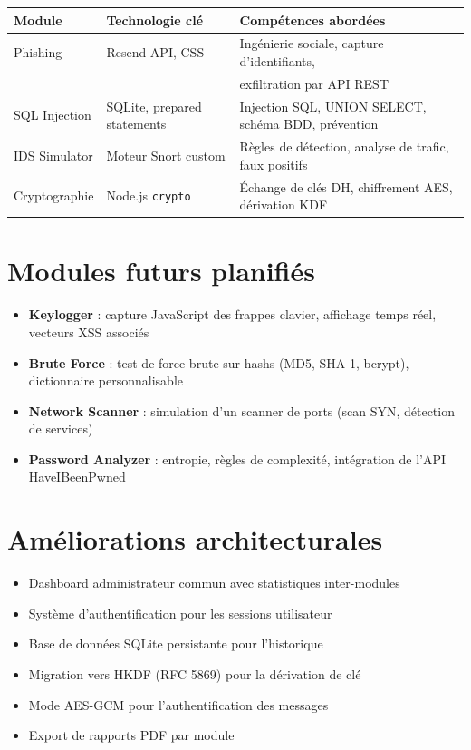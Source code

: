 \documentclass[12pt,a4paper]{report}
\newcommand{\code}[1]{\texttt{#1}}
\begin{document}
\begin{center}
\begin{tabular}{L{3cm} L{3.5cm} L{7cm}}
  \toprule
  \textbf{Module} & \textbf{Technologie clé} & \textbf{Compétences abordées} \\
  \midrule
  Phishing
    & Resend API, CSS
    & Ingénierie sociale, capture d'identifiants,\\
    & & exfiltration par API REST \\[5pt]
  SQL Injection
    & SQLite, prepared statements
    & Injection SQL, UNION SELECT, schéma BDD, prévention \\[5pt]
  IDS Simulator
    & Moteur Snort custom
    & Règles de détection, analyse de trafic, faux positifs \\[5pt]
  Cryptographie
    & Node.js \code{crypto}
    & Échange de clés DH, chiffrement AES, dérivation KDF \\
  \bottomrule
\end{tabular}
\end{center}

\section{Modules futurs planifiés}

\begin{itemize}
  \item \textbf{Keylogger} : capture JavaScript des frappes clavier,
        affichage temps réel, vecteurs XSS associés
  \item \textbf{Brute Force} : test de force brute sur hashs (MD5, SHA-1,
        bcrypt), dictionnaire personnalisable
  \item \textbf{Network Scanner} : simulation d'un scanner de ports
        (scan SYN, détection de services)
  \item \textbf{Password Analyzer} : entropie, règles de complexité,
        intégration de l'API HaveIBeenPwned
\end{itemize}

\section{Améliorations architecturales}

\begin{itemize}
  \item Dashboard administrateur commun avec statistiques inter-modules
  \item Système d'authentification pour les sessions utilisateur
  \item Base de données SQLite persistante pour l'historique
  \item Migration vers HKDF (RFC 5869) pour la dérivation de clé
  \item Mode AES-GCM pour l'authentification des messages
  \item Export de rapports PDF par module
\end{itemize}
\end{document}
